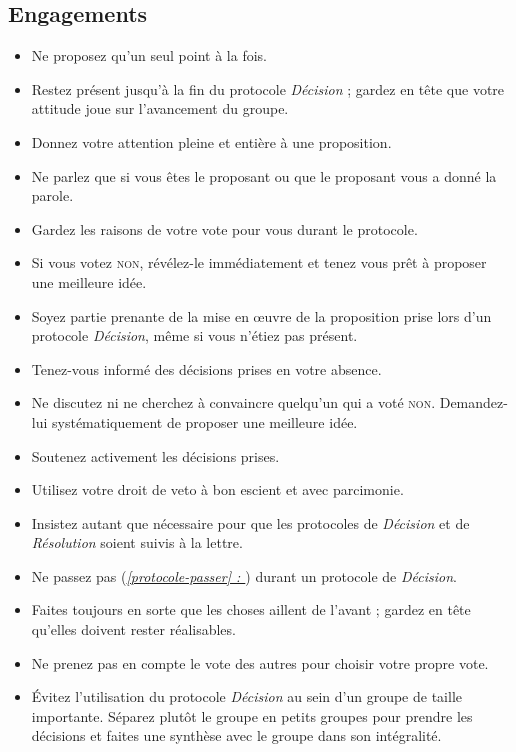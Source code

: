 \documentclass[paper=6in:9in,pagesize=pdftex,headinclude=on,footinclude=on,12pt]{scrbook}
\newcommand*{\fullref}[1]{\textit{\hyperref[{#1}]{\autoref*{#1} : \nameref*{#1}}}}
\begin{document}
\subsection{Engagements}
\begin{itemize}
	\item Ne proposez qu'un seul point à la fois.
	\item Restez présent jusqu'à la fin du protocole \emph{Décision} ; gardez en tête que votre attitude joue sur l'avancement du groupe.
	\item Donnez votre attention pleine et entière à une proposition.
	\item Ne parlez que si vous êtes le proposant ou que le proposant vous a donné la parole.
	\item Gardez les raisons de votre vote pour vous durant le protocole.
	\item Si vous votez \textsc{non}, révélez-le immédiatement et tenez vous prêt à proposer une meilleure idée.
	\item Soyez partie prenante de la mise en œuvre de la proposition prise lors d'un protocole \emph{Décision}, même si vous n'étiez pas présent.
	\item Tenez-vous informé des décisions prises en votre absence.
	\item Ne discutez ni ne cherchez à convaincre quelqu'un qui a voté \textsc{non}. Demandez-lui systématiquement de proposer une meil\-leure idée.
	\item Soutenez activement les décisions prises.
	\item Utilisez votre droit de veto à bon escient et avec parcimonie.
	\item Insistez autant que nécessaire pour que les protocoles de \emph{Décision} et de \emph{Résolution} soient suivis à la lettre.
	\item Ne passez pas (\fullref{protocole-passer}) durant un protocole de \emph{Décision}.
	\item Faites toujours en sorte que les choses aillent de l'avant ; gardez en tête qu'elles doivent rester réalisables.
	\item Ne prenez pas en compte le vote des autres pour choisir votre propre vote.
	\item Évitez l'utilisation du protocole \emph{Décision} au sein d'un groupe de taille importante. Séparez plutôt le groupe en petits groupes pour prendre les
	      décisions et faites une synthèse avec le groupe dans son intégralité.
\end{itemize}
\end{document}
